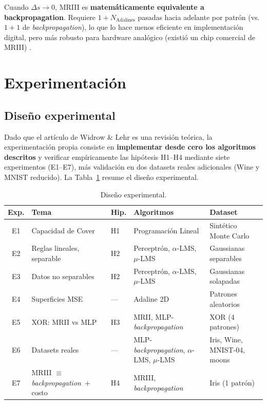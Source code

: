 \documentclass[11pt,a4paper]{article}
\newcommand{\aLMS}{$\alpha$-LMS}
\newcommand{\muLMS}{$\mu$-LMS}
\newcommand{\bp}{\textit{backpropagation}}
\begin{document}
Cuando $\Delta s \to 0$, MRIII es \textbf{matemáticamente equivalente a backpropagation}.
Requiere $1 + N_{\text{Adalines}}$ pasadas hacia adelante por patrón (vs. $1+1$ de \bp),
lo que lo hace menos eficiente en implementación digital, pero más robusto para hardware
analógico (existió un chip comercial de MRIII) \cite{widrow1990}.

\section{Experimentación}

\subsection{Diseño experimental}

Dado que el artículo de Widrow \& Lehr es una revisión teórica, la experimentación propia
consiste en \textbf{implementar desde cero los algoritmos descritos} y verificar empíricamente
las hipótesis H1--H4 mediante siete experimentos (E1--E7), más validación en dos datasets reales
adicionales (Wine y MNIST reducido). La Tabla~\ref{tab:diseno} resume el diseño experimental.

\begin{table}[H]\centering\footnotesize
\begin{tabular}{@{}clllp{3.2cm}@{}}
\toprule
\textbf{Exp.} & \textbf{Tema} & \textbf{Hip.} & \textbf{Algoritmos} & \textbf{Dataset} \\
\midrule
E1 & Capacidad de Cover & H1 & Programaci\'on Lineal & Sint\'etico Monte Carlo \\
E2 & Reglas lineales, separable & H2 & Perceptr\'on, \aLMS, \muLMS & Gaussianas separables \\
E3 & Datos no separables & H2 & Perceptr\'on, \aLMS, \muLMS & Gaussianas solapadas \\
E4 & Superficies MSE & --- & Adaline 2D & Patrones aleatorios \\
E5 & XOR: MRII vs MLP & H3 & MRII, MLP-\bp & XOR (4 patrones) \\
E6 & Datasets reales & --- & MLP-\bp, \aLMS, \muLMS & Iris, Wine, MNIST-04, moons \\
E7 & MRIII $\equiv$ \bp~+ costo & H4 & MRIII, \bp & Iris (1 patr\'on) \\
\bottomrule
\end{tabular}
\caption{Diseño experimental.}\label{tab:diseno}
\end{table}
\end{document}
